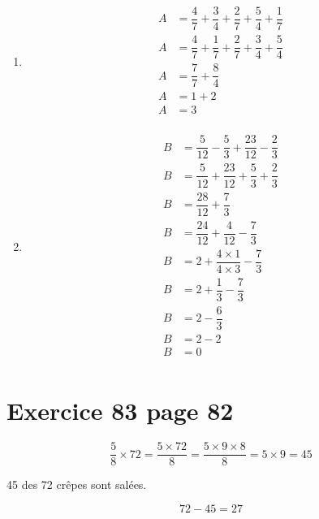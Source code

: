 \documentclass[12pt,a4paper]{article}
\begin{document}
\begin{multicols}{2}
	\begin{enumerate}
		\item \begin{align*}
			A &= \dfrac{4}{7} + \dfrac{3}{4} + \dfrac{2}{7} + \dfrac{5}{4}  + \dfrac{1}{7} \\
			A &= \dfrac{4}{7} + \dfrac{1}{7} + \dfrac{2}{7} + \dfrac{3}{4} + \dfrac{5}{4}\\
			A &= \dfrac{7}{7} + \dfrac{8}{4} \\
			A &= 1 + 2 \\
			A &= 3 \\
		\end{align*}
		
		
		\item \begin{align*}
		B &= \dfrac{5}{12} - \dfrac{5}{3} + \dfrac{23}{12} - \dfrac{2}{3}\\
		B &= \dfrac{5}{12} + \dfrac{23}{12} + \dfrac{5}{3}  + \dfrac{2}{3}\\
		B &= \dfrac{28}{12} + \dfrac{7}{3} \\
		B &= \dfrac{24}{12} + \dfrac{4}{12} - \dfrac{7}{3} \\
		B &= 2 + \dfrac{4 \times 1}{4 \times 3} - \dfrac{7}{3} \\
		B &= 2 + \dfrac{1}{3} - \dfrac{7}{3} \\
		B &= 2 - \dfrac{6}{3} \\
		B &= 2 - 2 \\
		B &= 0 \\
		\end{align*}
		
		
		
	\end{enumerate}
	
	
\end{multicols}




\section*{Exercice 83 page 82}


\begin{equation*}
	\dfrac{5}{8} \times 72 = \dfrac{5 \times 72}{8} = \dfrac{5 \times 9 \times 8}{8} = 5 \times 9 = 45
\end{equation*}

45 des 72 crêpes sont salées.

\begin{equation*}
	72 - 45 = 27
\end{equation*}
\end{document}
